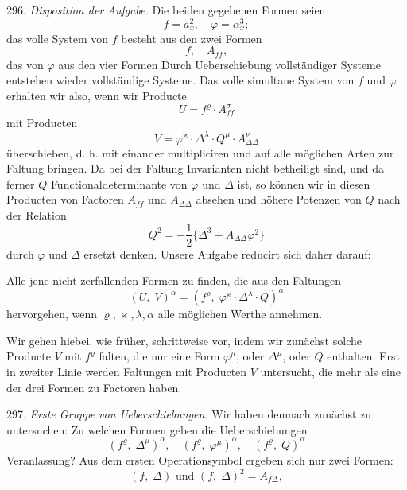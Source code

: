 
296. \textit{Disposition der Aufgabe.} Die beiden gegebenen Formen seien
\[
f = a_x^2, \quad \varphi = \alpha_x^3;
\]
das volle System von $f$ besteht aus den zwei Formen
\[
f, \quad A_{ff},
\]
das von $\varphi$ aus den vier Formen
Durch Ueberschiebung vollständiger Systeme entstehen wieder vollständige Systeme. Das volle simultane System von $f$ und $\varphi$ erhalten wir also, wenn wir Producte
\[
U = f^\varrho \cdot A_{ff}^\sigma
\]
mit Producten
\[
V = \varphi^\varkappa \cdot \Delta^\lambda \cdot Q^\mu \cdot A_{\Delta\Delta}^\nu
\]
überschieben, d. h. mit einander multipliciren und auf alle möglichen Arten zur Faltung bringen. Da bei der Faltung Invarianten nicht betheiligt sind, und da ferner $Q$ Functionaldeterminante von $\varphi$ und $\Delta$ ist, so können wir in diesen Producten von Factoren $A_{ff}$ und $A_{\Delta\Delta}$ absehen und höhere Potenzen von $Q$ nach der Relation
\[
Q^2 = -\frac{1}{2}\{\Delta^3 + A_{\Delta\Delta}\varphi^2\}
\]
durch $\varphi$ und $\Delta$ ersetzt denken. Unsere Aufgabe reducirt sich daher darauf:

\glqq Alle jene nicht zerfallenden Formen zu finden, die aus den Faltungen
\[
(U, \; V)^\alpha = (f^\varrho, \; \varphi^\varkappa \cdot \Delta^\lambda \cdot Q)^\alpha
\]
hervorgehen, wenn $\varrho, \varkappa, \lambda, \alpha$ alle möglichen Werthe annehmen.\grqq{}

Wir gehen hiebei, wie früher, schrittweise vor, indem wir zunächst solche Producte $V$ mit $f^\varrho$ falten, die nur eine Form $\varphi^\mu$, oder $\Delta^\mu$, oder $Q$ enthalten. Erst in zweiter Linie werden Faltungen mit Producten $V$ untersucht, die mehr als eine der drei Formen zu Factoren haben.

297. \textit{Erste Gruppe von Ueberschiebungen.} Wir haben demnach zunächst zu untersuchen: Zu welchen Formen geben die Ueberschiebungen
\[
(f^\varrho, \; \Delta^\mu)^\alpha, \quad (f^\varrho, \; \varphi^\mu)^\alpha, \quad (f^\varrho, \; Q)^\alpha
\]
Veranlassung? Aus dem ersten Operationsymbol ergeben sich nur zwei Formen:
\[
(f, \; \Delta) \text{ und } (f, \; \Delta)^2 = A_{f\Delta},
\]


